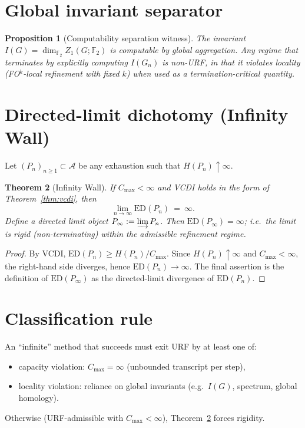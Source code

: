 \documentclass[11pt]{article}
\newtheorem{theorem}{Theorem}
\newtheorem{proposition}[theorem]{Proposition}
\theoremstyle{definition}
\theoremstyle{remark}
\newcommand{\ED}{\mathrm{ED}}
\newcommand{\F}{\mathbb{F}}
\begin{document}
\section{Global invariant separator}
\begin{proposition}[Computability separation witness]
\label{prop:sep}
The invariant \(I(G)=\dim_{\F_2}Z_1(G;\F_2)\) is computable by global aggregation. Any regime that terminates by explicitly computing \(I(G_n)\) is non-URF, in that it violates locality (FO\(^k\)-local refinement with fixed \(k\)) when used as a termination-critical quantity.
\end{proposition}

\section{Directed-limit dichotomy (Infinity Wall)}
Let \((P_n)_{n\ge 1}\subset\mathcal{A}\) be any exhaustion such that \(H(P_n)\uparrow\infty\).

\begin{theorem}[Infinity Wall]
\label{thm:infwall}
If \(C_{\max}<\infty\) and VCDI holds in the form of Theorem~\ref{thm:vcdi}, then
\[
\lim_{n\to\infty}\ED(P_n)\ =\ \infty.
\]
Define a directed limit object \(P_\infty:=\varinjlim P_n\). Then \(\ED(P_\infty)=\infty\); i.e.\ the limit is rigid (non-terminating) within the admissible refinement regime.
\end{theorem}

\begin{proof}
By VCDI, \(\ED(P_n)\ge H(P_n)/C_{\max}\). Since \(H(P_n)\uparrow\infty\) and \(C_{\max}<\infty\), the right-hand side diverges, hence \(\ED(P_n)\to\infty\). The final assertion is the definition of \(\ED(P_\infty)\) as the directed-limit divergence of \(\ED(P_n)\).
\end{proof}

\section{Classification rule}
An ``infinite'' method that succeeds must exit URF by at least one of:
\begin{itemize}
\item capacity violation: \(C_{\max}=\infty\) (unbounded transcript per step),
\item locality violation: reliance on global invariants (e.g.\ \(I(G)\), spectrum, global homology).
\end{itemize}
Otherwise (URF-admissible with \(C_{\max}<\infty\)), Theorem~\ref{thm:infwall} forces rigidity.
\end{document}
